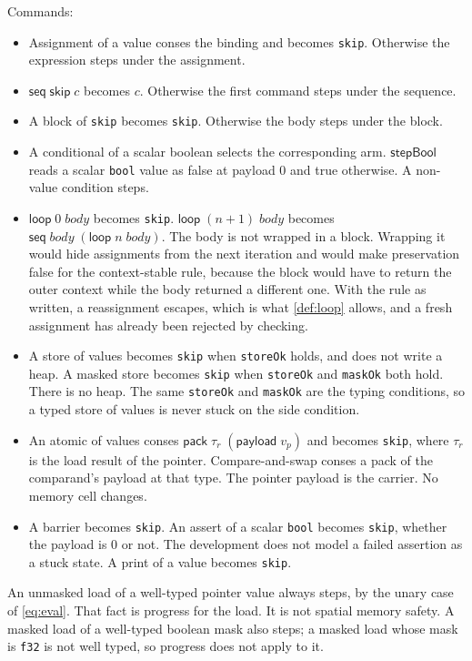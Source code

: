 \documentclass[a4paper,UKenglish,anonymous,cleveref,autoref]{lipics-v2021}
\begin{document}
Commands:
\begin{itemize}
\item Assignment of a value conses the binding and becomes \texttt{skip}.
Otherwise the expression steps under the assignment.
\item \(\mathsf{seq}\;\mathsf{skip}\;c\) becomes \(c\).
Otherwise the first command steps under the sequence.
\item A block of \texttt{skip} becomes \texttt{skip}.
Otherwise the body steps under the block.
\item A conditional of a scalar boolean selects the corresponding arm.
\(\mathsf{stepBool}\) reads a scalar \texttt{bool} value as false at payload \(0\) and true otherwise.
A non-value condition steps.
\item \(\mathsf{loop}\;0\;\mathit{body}\) becomes \texttt{skip}.
\(\mathsf{loop}\;(n{+}1)\;\mathit{body}\) becomes \(\mathsf{seq}\;\mathit{body}\;(\mathsf{loop}\;n\;\mathit{body})\).
The body is not wrapped in a block.
Wrapping it would hide assignments from the next iteration and would make preservation false for the context-stable rule, because the block would have to return the outer context while the body returned a different one.
With the rule as written, a reassignment escapes, which is what \cref{def:loop} allows, and a fresh assignment has already been rejected by checking.
\item A store of values becomes \texttt{skip} when \texttt{storeOk} holds, and does not write a heap.
A masked store becomes \texttt{skip} when \texttt{storeOk} and \texttt{maskOk} both hold.
There is no heap.
The same \texttt{storeOk} and \texttt{maskOk} are the typing conditions, so a typed store of values is never stuck on the side condition.
\item An atomic of values conses \(\mathsf{pack}\;\tau_r\;(\mathsf{payload}\;v_p)\) and becomes \texttt{skip}, where \(\tau_r\) is the load result of the pointer.
Compare-and-swap conses a pack of the comparand's payload at that type.
The pointer payload is the carrier.
No memory cell changes.
\item A barrier becomes \texttt{skip}.
An assert of a scalar \texttt{bool} becomes \texttt{skip}, whether the payload is \(0\) or not.
The development does not model a failed assertion as a stuck state.
A print of a value becomes \texttt{skip}.
\end{itemize}

An unmasked load of a well-typed pointer value always steps, by the unary case of \cref{eq:eval}.
That fact is progress for the load.
It is not spatial memory safety.
A masked load of a well-typed boolean mask also steps; a masked load whose mask is \texttt{f32} is not well typed, so progress does not apply to it.
\end{document}
